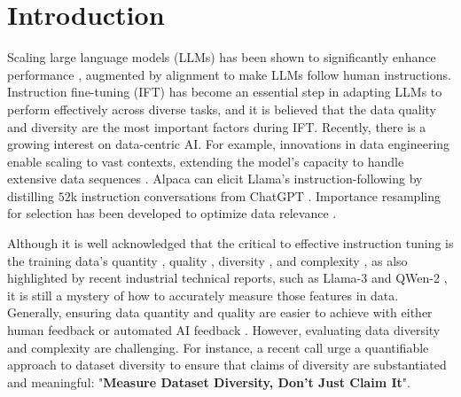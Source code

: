\section{Introduction}
Scaling large language models (LLMs) has been shown to significantly enhance performance \citep{kaplan2020scaling, achiam2023gpt}, augmented by alignment \citep{bai2022constitutional, rafailov2024direct, schulman2017proximal} to make LLMs follow human instructions. Instruction fine-tuning (IFT) \citep{weifinetuned, longpre2023flan, sanhmultitask, ouyang2022training} has become an essential step in adapting LLMs to perform effectively across diverse tasks, and it is believed that the data quality and diversity are the most important factors during IFT.
Recently, there is a growing interest on data-centric AI.
For example, innovations in data engineering enable scaling to vast contexts, extending the model’s capacity to handle extensive data sequences \citep{fudata}. Alpaca \citep{taori2023stanford} can elicit Llama's instruction-following by distilling $52$k instruction conversations from ChatGPT \citep{chatgpt2023}.
Importance resampling for selection has been developed to optimize data relevance \citep{xie2023data}. 


Although it is well acknowledged that the critical to effective instruction tuning is the training data's quantity \citep{ding2023enhancing}, quality \citep{chenalpagasus}, diversity \citep{bukharin2023data}, and complexity \citep{wang2023self}, as also highlighted by recent industrial technical reports, such as Llama-3 \citep{dubey2024llama} and QWen-2 \citep{yang2024qwen2},
it is still a mystery of how to accurately measure those features in data.
Generally, ensuring data quantity and quality are easier to achieve with either human feedback \citep{ouyang2022training} or automated AI feedback \citep{lee2023rlaif}.
However, evaluating data diversity and complexity are challenging. For instance, a recent call \citep{zhao2024position} urge a quantifiable approach to dataset diversity to ensure that claims of diversity are substantiated and meaningful: "\textbf{Measure Dataset Diversity, Don't Just Claim It}". 


